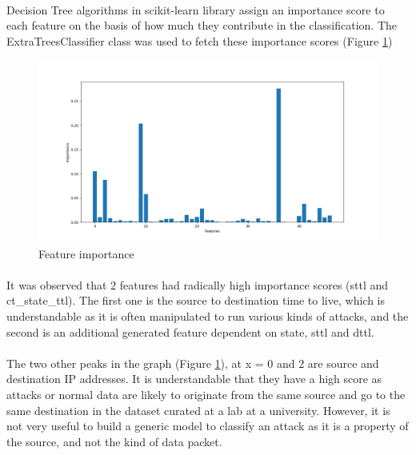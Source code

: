 \paragraph{}
Decision Tree algorithms in scikit-learn library assign an importance score to each feature on the basis of how much they contribute in the classification. The ExtraTreesClassifier class was used to fetch these importance scores (Figure \ref{feature_importance})
\begin{figure}[h]
    \hfill\includegraphics[width=1\textwidth]{Chapter3/feature_importance}\hspace*{\fill}
    \caption{Feature importance}
    \label{feature_importance}
\end{figure}

\paragraph{}
It was observed that 2 features had radically high importance scores (sttl and ct\_state\_ttl). The first one is the source to destination time to live, which is understandable as it is often manipulated to run various kinds of attacks, and the second is an additional generated feature dependent on state, sttl and dttl.

\paragraph{}
The two other peaks in the graph (Figure \ref{feature_importance}), at x = 0 and 2 are source and destination IP addresses. It is understandable that they have a high score as attacks or normal data are likely to originate from the same source and go to the same destination in the dataset curated at a lab at a university. However, it is not very useful to build a generic model to classify an attack as it is a property of the source, and not the kind of data packet.

